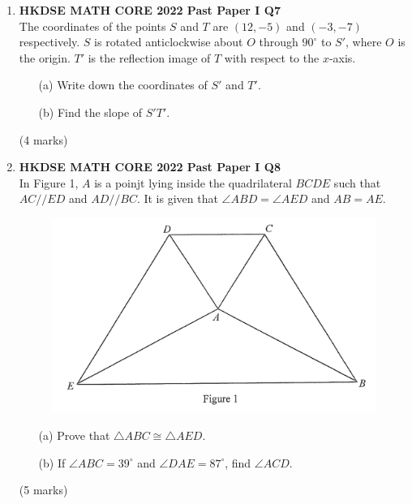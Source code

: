 \documentclass[12pt]{article}
\begin{document}
\begin{enumerate}
	\item \textbf{HKDSE MATH CORE 2022 Past Paper I Q7}\\
	The coordinates of the points $S$ and $T$ are $(12, -5)$ and $(-3, -7)$ respectively. $S$ is rotated anticlockwise about $O$ through $90^\circ$ to $S'$, where $O$ is the origin. $T'$ is the reflection image of $T$ with respect to the $x$-axis.
	\begin{enumerate}
		\item[(a)] Write down the coordinates of $S'$ and $T'$.
		\item[(b)] Find the slope of $S'T'$.
	\end{enumerate}
	(4 marks)
	
	\item \textbf{HKDSE MATH CORE 2022 Past Paper I Q8}\\
	In Figure 1, $A$ is a poinjt lying inside the quadrilateral $BCDE$ such that $AC // ED$ and $AD // BC$. It is given that $\angle ABD = \angle AED$ and $AB = AE$.
	\begin{figure}[H]
		\centering
		\includegraphics[width = .3\linewidth]{2022Figure1.1}
	\end{figure}
	\begin{enumerate}
		\item[(a)] Prove that $\triangle ABC \cong \triangle AED$.
		\item[(b)] If $\angle ABC = 39^\circ$ and $\angle DAE = 87^\circ$, find $\angle ACD$.
	\end{enumerate}
	(5 marks)	
	

\end{enumerate}
\end{document}
